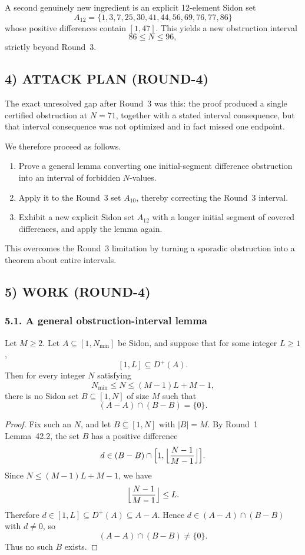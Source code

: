 A second genuinely new ingredient is an explicit 12-element Sidon set
\[
A_{12}=\{1,3,7,25,30,41,44,56,69,76,77,86\}
\]
whose positive differences contain \([1,47]\).  This yields a new obstruction interval
\[
86\le N\le 96,
\]
strictly beyond Round~3.

\subsection{4) ATTACK PLAN (ROUND-4)}
The exact unresolved gap after Round~3 was this: the proof produced a single certified obstruction at \(N=71\), together with a stated interval consequence, but that interval consequence was not optimized and in fact missed one endpoint.

We therefore proceed as follows.
\begin{enumerate}
  \item Prove a general lemma converting one initial-segment difference obstruction into an interval of forbidden \(N\)-values.
  \item Apply it to the Round~3 set \(A_{10}\), thereby correcting the Round~3 interval.
  \item Exhibit a new explicit Sidon set \(A_{12}\) with a longer initial segment of covered differences, and apply the lemma again.
\end{enumerate}

This overcomes the Round~3 limitation by turning a sporadic obstruction into a theorem about entire intervals.

\subsection{5) WORK (ROUND-4)}

\subsubsection*{5.1. A general obstruction-interval lemma}
\begin{lemma}\label{lem:interval-obstruction}
Let \(M\ge 2\).  Let \(A\subseteq[1,N_{\min}]\) be Sidon, and suppose that for some integer \(L\ge 1\),
\[
[1,L]\subseteq D^+(A).
\]
Then for every integer \(N\) satisfying
\[
N_{\min}\le N\le (M-1)L+M-1,
\]
there is no Sidon set \(B\subseteq[1,N]\) of size \(M\) such that
\[
(A-A)\cap(B-B)=\{0\}.
\]
\end{lemma}

\begin{proof}
Fix such an \(N\), and let \(B\subseteq[1,N]\) with \(|B|=M\).  By Round~1 Lemma~42.2, the set \(B\) has a positive difference
\[
d\in(B-B)\cap\Bigl[1,\Bigl\lfloor\frac{N-1}{M-1}\Bigr\rfloor\Bigr].
\]
Since \(N\le (M-1)L+M-1\), we have
\[
\Bigl\lfloor\frac{N-1}{M-1}\Bigr\rfloor\le L.
\]
Therefore \(d\in[1,L]\subseteq D^+(A)\subseteq A-A\).  Hence \(d\in (A-A)\cap(B-B)\) with \(d\ne 0\), so
\[
(A-A)\cap(B-B)\neq \{0\}.
\]
Thus no such \(B\) exists.
\end{proof}

